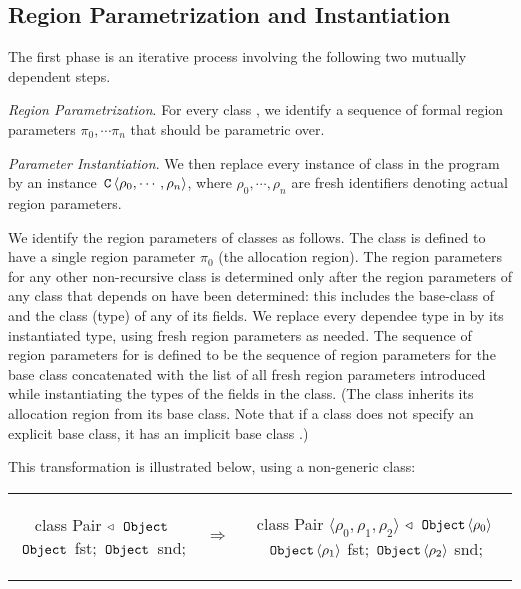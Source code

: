 \subsection{Region Parametrization and Instantiation}
\label{sec:fb-templatization}

The first phase is an iterative process involving the following two
mutually dependent steps.

\emph{Region Parametrization}. For every class , we identify
a sequence of formal region parameters $\pi_0, \cdots \pi_n$ that 
should be parametric over.

\emph{Parameter Instantiation}.
We then replace every instance of class  in the program by an instance
$\,{\tt C}\,\langle \rho_0, \cdots, \rho_n \rangle$, where $\rho_0, \cdots, \rho_n$
are fresh identifiers denoting actual region parameters.

We identify the region parameters of classes as follows.
The class  is defined to have a single region parameter $\pi_0$ (the allocation region).
The region parameters for any other non-recursive class  is determined
only after the region parameters of any class that  depends on have been
determined: this includes the base-class  of  and the class (type)
of any of its fields.
We replace every dependee type  in  by its instantiated type,
using fresh region parameters as needed.
The sequence of region parameters for  is defined to be
the sequence of region parameters for the base class  concatenated
with the list of all  fresh region parameters introduced while instantiating the types
of the fields in the class.
(The class inherits its allocation region from its base class. Note that if
a class does not specify an explicit base class, it has an implicit base class
.)

This transformation is illustrated below, using a non-generic  class:

\begin{tabular}{ccc}
\begin{minipage}{0.28\linewidth}
\begin{codejava}
class Pair
  $\triangleleft$ $\,{\tt Object}\,$
{
  $\,{\tt Object}\,$ fst;
  $\,{\tt Object}\,$ snd;
}
\end{codejava}
\end{minipage}
&
$\Rightarrow$
&
\begin{minipage}{0.5\linewidth}
\begin{codejava}
class Pair $\langle \rho_0, \rho_1, \rho_2 \rangle$
  $\triangleleft$ $\,{\tt Object}\, \langle \rho_0 \rangle$
{
  $\,{\tt Object}\, \langle \rho_1 \rangle$ fst;
  $\,{\tt Object}\, \langle \rho_2 \rangle$ snd;
}
\end{codejava}
\end{minipage}
\end{tabular}

